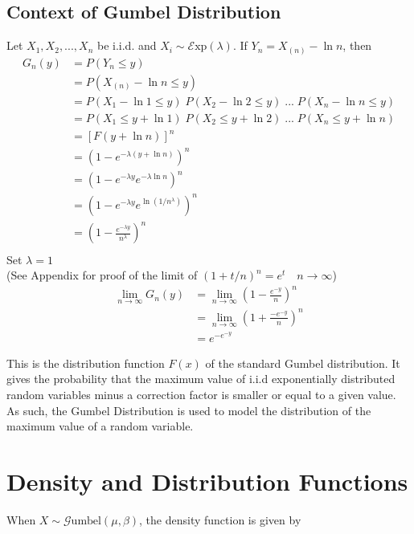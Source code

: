 \documentclass[titlepage,12 pt]{article}
\begin{document}
\subsection{Context of Gumbel Distribution}

Let $X_1, X_2,..., X_n$ be i.i.d. and $X_i\sim \mathcal{E}\text{xp}(\lambda)$. If $Y_n=X_{(n)}-\ln{n}$, then
\begin{align*}
G_{n}(y)&=P(Y_n\le y) \\[2mm]
&=P(X_{(n)}-\ln{n}\le y)\\[2mm]
&=P(X_1-\ln{1}\le y)\;P(X_2-\ln{2}\le y)\;...\;P(X_n-\ln{n}\le y) \\[2mm]
&=P(X_1\le y+\ln{1})\;P(X_2\le y+\ln{2})\;...\;P(X_n\le y+\ln{n}) \\[2mm]
&=\left[ F(y+\ln{n}) \right]^{n} \\[2mm]
&=\left( 1-e^{-\lambda(y+\ln{n})} \right)^{n} \\[2mm]
&=\left( 1-e^{-\lambda y}e^{-\lambda\ln{n}} \right)^{n} \\[2mm]
&=\left( 1-e^{-\lambda y}e^{\ln{(1/n^{\lambda})}} \right)^{n} \\[2mm]
&=\left( 1-\frac{e^{-\lambda y}}{n^{\lambda}} \right)^{n} \\[2mm]
\end{align*}
Set $\lambda=1$ \\
(See Appendix for proof of the limit of $(1+t/n)^n=e^t \quad n\to\infty$)
\begin{align*}
\lim_{n\to\infty} G_{n}(y) &=\lim_{n\to\infty} \left( 1-\frac{e^{-y}}{n} \right)^{n} \\[2mm]
&= \lim_{n\to\infty} \left( 1+ \frac{-e^{-y}}{n} \right)^{n} \\[2mm]
&= e^{-e^{-y}}
\end{align*}

This is the distribution function $F(x)$ of the standard Gumbel distribution. It gives the probability that the maximum value of i.i.d exponentially distributed random variables minus a correction factor is smaller or equal to a given value. As such, the Gumbel Distribution is used to model the distribution of the maximum value of a random variable.

\section{Density and Distribution Functions}

When $X\sim \mathcal{G}\text{umbel}(\mu,\beta)$, the density function is given by 
\end{document}

